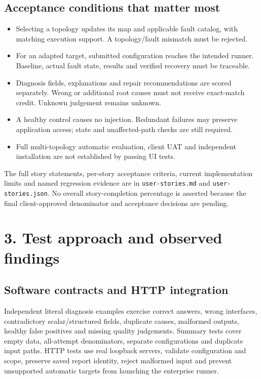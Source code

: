 \documentclass[10pt,a4paper]{article}
\begin{document}
\subsection*{Acceptance conditions that matter most}
\begin{itemize}
\item Selecting a topology updates its map and applicable fault catalog, with matching execution support. A topology/fault mismatch must be rejected.
\item For an adapted target, submitted configuration reaches the intended runner. Baseline, actual fault state, results and verified recovery must be traceable.
\item Diagnosis fields, explanations and repair recommendations are scored separately. Wrong or additional root causes must not receive exact-match credit. Unknown judgement remains unknown.
\item A healthy control causes no injection. Redundant failures may preserve application access; state and unaffected-path checks are still required.
\item Full multi-topology automatic evaluation, client UAT and independent installation are not established by passing UI tests.
\end{itemize}

The full story statements, per-story acceptance criteria, current implementation limits and named regression evidence are in \texttt{user-stories.md} and \texttt{user-stories.json}. No overall story-completion percentage is asserted because the final client-approved denominator and acceptance decisions are pending.

\newpage
\section*{3. Test approach and observed findings}
\subsection*{Software contracts and HTTP integration}
Independent literal diagnosis examples exercise correct answers, wrong interfaces, contradictory scalar/structured fields, duplicate causes, malformed outputs, healthy false positives and missing quality judgements. Summary tests cover empty data, all-attempt denominators, separate configurations and duplicate input paths. HTTP tests use real loopback servers, validate configuration and scope, preserve saved report identity, reject malformed input and prevent unsupported automatic targets from launching the enterprise runner.
\end{document}
